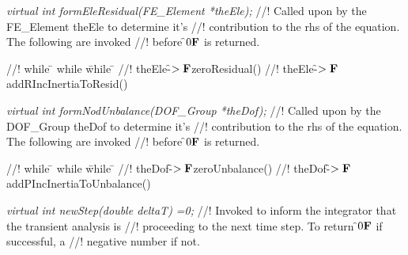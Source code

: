 {\em virtual int formEleResidual(FE\_Element *theEle);}
//! Called upon by the FE\_Element \p theEle to determine it's
//! contribution to the rhs of the equation. The following are invoked
//! before \f$0{\bf F}$ is returned.
\begin{tabbing}
//! while \= \+ while \= while \= \kill
//! theEle-\f$>{\bf F}$zeroResidual()
//! theEle-\f$>{\bf F}$addRIncInertiaToResid()
\end{tabbing}

{\em virtual int formNodUnbalance(DOF\_Group *theDof);}
//! Called upon by the DOF\_Group \p theDof to determine it's
//! contribution to the rhs of the equation. The following are invoked
//! before \f$0{\bf F}$ is returned.
\begin{tabbing}
//! while \= \+ while \= while \= \kill
//! theDof-\f$>{\bf F}$zeroUnbalance()
//! theDof-\f$>{\bf F}$addPIncInertiaToUnbalance()
\end{tabbing}

{\em virtual int newStep(double deltaT) =0;}
//! Invoked to inform the integrator that the transient analysis is
//! proceeding to the next time step. To return \f$0{\bf F}$ if successful, a
//! negative number if not.




